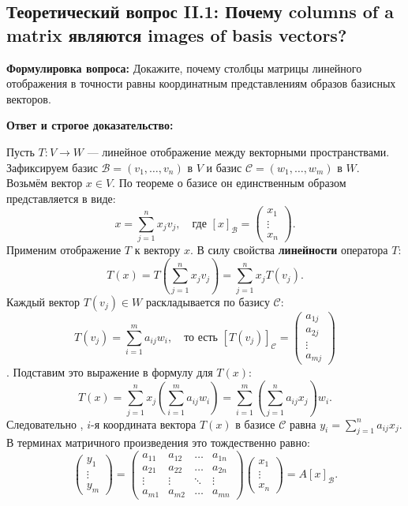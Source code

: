 
\subsection{Теоретический вопрос II.1: Почему columns of a matrix являются images of basis vectors?}
\textbf{Формулировка вопроса:} Докажите, почему столбцы матрицы линейного отображения в точности равны координатным
представлениям образов базисных векторов.

\textbf{Ответ и строгое доказательство:}

Пусть $T \colon V \to W$ — линейное отображение между векторными пространствами.
Зафиксируем базис $\mathcal{B} = (v_1, \dots, v_n)$ в $V$ и базис $\mathcal{C} = (w_1, \dots, w_m)$ в $W$.
Возьмём вектор $x \in V$.
По теореме о базисе он единственным образом представляется в виде:
\[ x = \sum_{j=1}^n x_j v_j, \quad \text{где } [x]_\mathcal{B} = \begin{pmatrix}
                                                                     x_1 \\ \vdots \\ x_n
\end{pmatrix}. \]
Применим отображение $T$ к вектору $x$.
В силу свойства \textbf{линейности} оператора $T$:
\[ T(x) = T\left(\sum_{j=1}^n x_j v_j\right) = \sum_{j=1}^n x_j T(v_j). \]
Каждый вектор $T(v_j) \in W$ раскладывается по базису $\mathcal{C}$:
\[ T(v_j) = \sum_{i=1}^m a_{ij} w_i, \quad \text{то есть } [T(v_j)]_\mathcal{C} =
\begin{pmatrix}
            a_{1j} \\ a_{2j} \\ \vdots \\ a_{mj}
\end{pmatrix} \].
Подставим это выражение в формулу для $T(x)$:
\[ T(x) = \sum_{j=1}^n x_j \left( \sum_{i=1}^m a_{ij} w_i \right) = \sum_{i=1}^m \left( \sum_{j=1}^n a_{ij} x_j
\right) w_i.
\] Следовательно , $i$-я координата вектора $T(x)$ в базисе $\mathcal{C}$ равна $y_i = \sum_{j=1}^n a_{ij} x_j$.
В терминах матричного произведения это тождественно равно:
\[ \begin{pmatrix}
       y_1 \\ \vdots \\ y_m
\end{pmatrix} = \begin{pmatrix}
                    a_{11} & a_{12} & \dots & a_{1n} \\
                    a_{21} & a_{22} & \dots & a_{2n} \\
                    \vdots & \vdots & \ddots & \vdots \\
                    a_{m1} & a_{m2} & \dots & a_{mn}
\end{pmatrix} \begin{pmatrix}
                  x_1 \\ \vdots \\ x_n
\end{pmatrix} = A [x]_\mathcal{B}. \]

